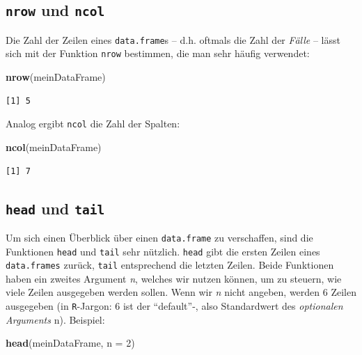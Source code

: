 \documentclass[12pt,]{tufte-book}
\newenvironment{Shaded}{\begin{snugshade}}{\end{snugshade}}
\newcommand{\KeywordTok}[1]{\textcolor[rgb]{0.13,0.29,0.53}{\textbf{#1}}}
\newcommand{\DataTypeTok}[1]{\textcolor[rgb]{0.13,0.29,0.53}{#1}}
\newcommand{\DecValTok}[1]{\textcolor[rgb]{0.00,0.00,0.81}{#1}}
\newcommand{\NormalTok}[1]{#1}
\theoremstyle{definition}
\theoremstyle{definition}
\theoremstyle{definition}
\theoremstyle{remark}
\begin{document}
\subsection{\texorpdfstring{\texttt{nrow} und
\texttt{ncol}}{nrow und ncol}}\label{nrow-und-ncol}

Die Zahl der Zeilen eines \texttt{data.frame}s -- d.h. oftmals die Zahl
der \emph{Fälle} -- lässt sich mit der Funktion \texttt{nrow} bestimmen,
die man sehr häufig verwendet:

\begin{Shaded}
\begin{Highlighting}[]
\KeywordTok{nrow}\NormalTok{(meinDataFrame)}
\end{Highlighting}
\end{Shaded}

\begin{verbatim}
[1] 5
\end{verbatim}

Analog ergibt \texttt{ncol} die Zahl der Spalten:

\begin{Shaded}
\begin{Highlighting}[]
\KeywordTok{ncol}\NormalTok{(meinDataFrame)}
\end{Highlighting}
\end{Shaded}

\begin{verbatim}
[1] 7
\end{verbatim}

\subsection{\texorpdfstring{\texttt{head} und
\texttt{tail}}{head und tail}}\label{head-und-tail}

Um sich einen Überblick über einen \texttt{data.frame} zu verschaffen,
sind die Funktionen \texttt{head} und \texttt{tail} sehr nützlich.
\texttt{head} gibt die ersten Zeilen eines \texttt{data.frames} zurück,
\texttt{tail} entsprechend die letzten Zeilen. Beide Funktionen haben
ein zweites Argument \emph{n}, welches wir nutzen können, um zu steuern,
wie viele Zeilen ausgegeben werden sollen. Wenn wir \emph{n} nicht
angeben, werden 6 Zeilen ausgegeben (in \texttt{R}-Jargon: 6 ist der
``default''-, also Standardwert des \emph{optionalen Arguments} n).
Beispiel:

\begin{Shaded}
\begin{Highlighting}[]
\KeywordTok{head}\NormalTok{(meinDataFrame, }\DataTypeTok{n =} \DecValTok{2}\NormalTok{)}
\end{Highlighting}
\end{Shaded}
\end{document}
